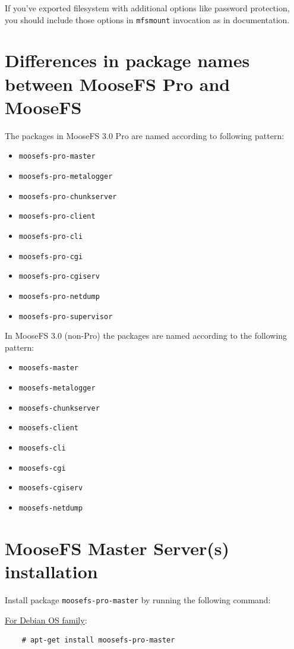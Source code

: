 \documentclass[a4paper,11pt,english]{report}
\def\code#1{\texttt{#1}}
\begin{document}
			If you've exported filesystem with additional options like password protection, you should include those options in \code{mfsmount} invocation as in documentation.


		\section{Differences in package names between MooseFS Pro and MooseFS}
		The packages in MooseFS 3.0 Pro are named according to following pattern:
		\begin{itemize}
			\item \code{moosefs-pro-master}
			\item \code{moosefs-pro-metalogger}
			\item \code{moosefs-pro-chunkserver}
			\item \code{moosefs-pro-client}
			\item \code{moosefs-pro-cli}
			\item \code{moosefs-pro-cgi}
			\item \code{moosefs-pro-cgiserv}
			\item \code{moosefs-pro-netdump}
			\item \code{moosefs-pro-supervisor}
		\end{itemize}
		
		\bigskip
		In MooseFS 3.0 (non-Pro) the packages are named according to the following pattern:
		\begin{itemize}
			\item \code{moosefs-master}
			\item \code{moosefs-metalogger}
			\item \code{moosefs-chunkserver}
			\item \code{moosefs-client}
			\item \code{moosefs-cli}
			\item \code{moosefs-cgi}
			\item \code{moosefs-cgiserv}
			\item \code{moosefs-netdump}
		\end{itemize}
		
		\section{MooseFS Master Server(s) installation}
		Install package \code{moosefs-pro-master} by running the following command:
		
		\underline{For Debian OS family}:
		\begin{lstlisting}
	# apt-get install moosefs-pro-master
		\end{lstlisting}
		
\end{document}
